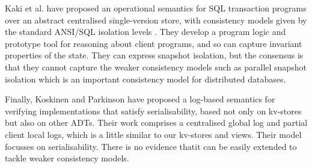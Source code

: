 Kaki et al. \citet{alonetogether} have proposed an operational
semantics for SQL transaction programs over an abstract centralised
single-version 
store, with consistency models given by the standard ANSI/SQL
isolation levels \cite{si}. They develop a program logic and prototype
tool for reasoning about client programs, and so can capture invariant
properties of the state. They can express snapshot isolation, but the consensus is that they cannot capture the weaker
consistency models such as parallel snapshot isolation \cite{PSI}
which is an important consistency model for distributed databases.




Finally,  Koskinen and Parkinson
\citet{push-pull} have proposed a log-based semantics for verifying
implementations that satisfy serialisability, based not only on
kv-stores but also on other ADTs. Their work comprises a centralised
global log and partial client local logs, which is a little similar to
our kv-stores and views. Their model focusses on serialisability.
There is no evidence thatit can be easily extended to tackle
weaker consistency models.  